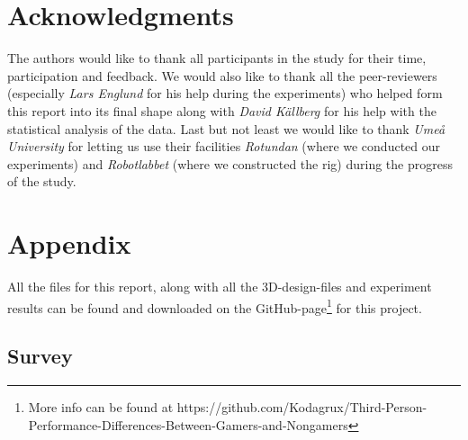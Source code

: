 \documentclass[runningheads,a4paper,oribibl]{llncs}
\begin{document}
\section{Acknowledgments}
The authors would like to thank all participants in the study for their time, participation and feedback. We would also like to thank all the peer-reviewers (especially \emph{Lars Englund} for his help during the experiments) who helped form this report into its final shape along with \emph{David Källberg} for his help with the statistical analysis of the data. Last but not least we would like to thank \emph{Umeå University} for letting us use their facilities \emph{Rotundan} (where we conducted our experiments) and \emph{Robotlabbet} (where we constructed the rig) during the progress of the study.








%



\appendix

\section{Appendix}
All the files for this report, along with all the 3D-design-files and experiment results can be found and downloaded on the GitHub-page\footnote{More info can be found at https://github.com/Kodagrux/Third-Person-Performance-Differences-Between-Gamers-and-Nongamers} for this project.
\subsection{Survey} \label{subsec:Survey}

\end{document}
